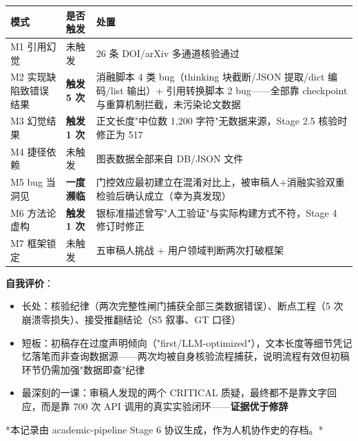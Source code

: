 \documentclass[11pt]{article}
\begin{document}
\begin{table}[htbp]
\centering
\small
\begin{tabular}{lll}
\hline
{\cjkfont 模式} & {\cjkfont 是否触发} & {\cjkfont 处置} \\
\hline
M1 {\cjkfont 引用幻觉} & {\cjkfont 未触发} & 26 {\cjkfont 条} DOI/arXiv {\cjkfont 多通道核验通过} \\
M2 {\cjkfont 实现缺陷致错误结果} & \textbf{{\cjkfont 触发} 5 {\cjkfont 次}} & {\cjkfont 消融脚本} 4 {\cjkfont 类} bug{\cjkfont （}thinking {\cjkfont 块截断}/JSON {\cjkfont 提取}/dict {\cjkfont 编码}/list {\cjkfont 输出）}+ {\cjkfont 引用转换脚本} 2 bug------{\cjkfont 全部靠} checkpoint {\cjkfont 与重算机制拦截，未污染论文数据} \\
M3 {\cjkfont 幻觉结果} & \textbf{{\cjkfont 触发} 1 {\cjkfont 次}} & {\cjkfont 正文长度}"{\cjkfont 中位数} 1,200 {\cjkfont 字符}"{\cjkfont 无数据来源，}Stage 2.5 {\cjkfont 核验时修正为} 517 \\
M4 {\cjkfont 捷径依赖} & {\cjkfont 未触发} & {\cjkfont 图表数据全部来自} DB/JSON {\cjkfont 文件} \\
M5 bug {\cjkfont 当洞见} & \textbf{{\cjkfont 一度濒临}} & {\cjkfont 门控效应最初建立在混淆对比上，被审稿人}+{\cjkfont 消融实验双重检验后确认成立（幸为真发现）} \\
M6 {\cjkfont 方法论虚构} & \textbf{{\cjkfont 触发} 1 {\cjkfont 次}} & {\cjkfont 银标准描述曾写}"{\cjkfont 人工验证}"{\cjkfont 与实际构建方式不符，}Stage 4 {\cjkfont 修订时修正} \\
M7 {\cjkfont 框架锁定} & {\cjkfont 未触发} & {\cjkfont 五审稿人挑战} + {\cjkfont 用户领域判断两次打破框架} \\
\hline
\end{tabular}
\end{table}
\textbf{{\cjkfont 自我评价}}{\cjkfont ：}

\begin{itemize}
\item {\cjkfont 长处：核验纪律（两次完整性闸门捕获全部三类数据错误）、断点工程（}5 {\cjkfont 次崩溃零损失）、接受推翻结论（}S5 {\cjkfont 叙事、}GT {\cjkfont 口径）}
\item {\cjkfont 短板：初稿存在过度声明倾向（}"first/LLM-optimized"{\cjkfont ），文本长度等细节凭记忆落笔而非查询数据源}------{\cjkfont 两次均被自身核验流程捕获，说明流程有效但初稿环节仍需加强}"{\cjkfont 数据即查}"{\cjkfont 纪律}
\item {\cjkfont 最深刻的一课：审稿人发现的两个} CRITICAL {\cjkfont 质疑，最终都不是靠文字回应，而是靠} 700 {\cjkfont 次} API {\cjkfont 调用的真实实验闭环}------\textbf{{\cjkfont 证据优于修辞}}
\end{itemize}
*{\cjkfont 本记录由} academic-pipeline Stage 6 {\cjkfont 协议生成，作为人机协作史的存档。}*
\end{document}
